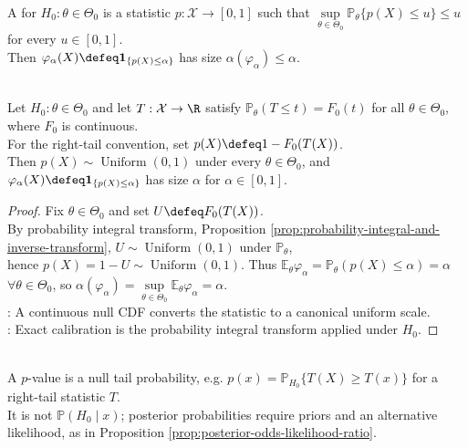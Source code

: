 \begin{definition} \label{def:p-value-and-validity} \\
A  for $H_0:\theta\in\Theta_0$ is a statistic $p:\mathcal{X}\to[0,1]$ such that $\sup\limits_{\theta\in\Theta_0}\mathbb{P}_\theta\{p(X)\leq u\}\leq u$ for every $u\in[0,1]$.\\
Then $\varphi_\alpha(X)\defeq\mathbf{1}_{\{p(X)\leq\alpha\}}$ has size $\alpha(\varphi_\alpha)\leq\alpha$.
\end{definition}

\begin{proposition} \label{prop:continuous-null-p-value-uniform} \\
Let $H_0:\theta\in\Theta_0$ and let $T:\mathcal{X}\to\R$ satisfy $\mathbb{P}_\theta(T\leq t)=F_0(t)$ for all $\theta\in\Theta_0$, where $F_0$ is continuous.\\
For the right-tail convention, set $p(X)\defeq1-F_0(T(X))$.\\
Then $p(X)\sim\operatorname{Uniform}(0,1)$ under every $\theta\in\Theta_0$, and $\varphi_\alpha(X)\defeq\mathbf{1}_{\{p(X)\leq\alpha\}}$ has size $\alpha$ for $\alpha\in[0,1]$.
\begin{proof} Fix $\theta\in\Theta_0$ and set $U\defeq F_0(T(X))$.\\
By probability integral transform, Proposition \ref{prop:probability-integral-and-inverse-transform}, $U\sim\operatorname{Uniform}(0,1)$ under $\mathbb{P}_\theta$,\\
hence $p(X)=1-U\sim\operatorname{Uniform}(0,1)$. Thus $\mathbb{E}_\theta\varphi_\alpha=\mathbb{P}_\theta(p(X)\leq\alpha)=\alpha$ $\forall \theta\in\Theta_0$, so $\alpha(\varphi_\alpha)=\sup\limits_{\theta\in\Theta_0}\mathbb{E}_\theta\varphi_\alpha=\alpha$.\\
: A continuous null CDF converts the statistic to a canonical uniform scale.\\
: Exact calibration is the probability integral transform applied under $H_0$.
\end{proof}
\end{proposition}

\begin{remark} \label{rem:p-values-are-not-posterior-probabilities} \\
A $p$-value is a null tail probability, e.g. $p(x)=\mathbb{P}_{H_0}\{T(X)\geq T(x)\}$ for a right-tail statistic $T$.\\
It is not $\mathbb{P}(H_0\mid x)$; posterior probabilities require priors and an alternative likelihood, as in Proposition \ref{prop:posterior-odds-likelihood-ratio}.
\end{remark}

